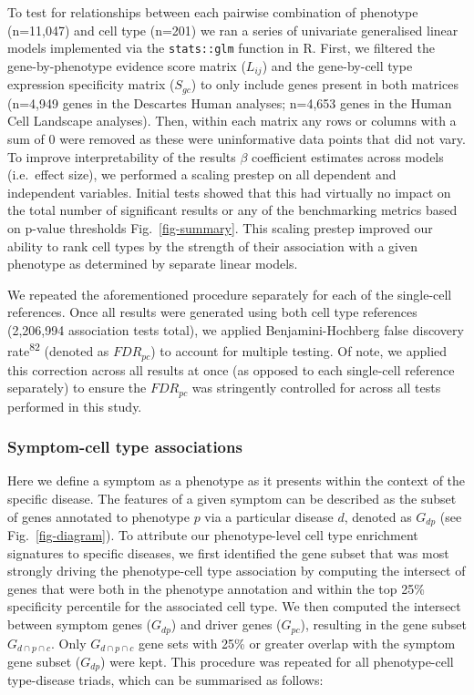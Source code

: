 \documentclass[
]{agujournal2019}
\begin{document}
To test for relationships between each pairwise combination of phenotype
(n=11,047) and cell type (n=201) we ran a series of univariate
generalised linear models implemented via the \texttt{stats::glm}
function in R. First, we filtered the gene-by-phenotype evidence score
matrix (\(L_{ij}\)) and the gene-by-cell type expression specificity
matrix (\(S_{gc}\)) to only include genes present in both matrices
(n=4,949 genes in the Descartes Human analyses; n=4,653 genes in the
Human Cell Landscape analyses). Then, within each matrix any rows or
columns with a sum of 0 were removed as these were uninformative data
points that did not vary. To improve interpretability of the results
\(\beta\) coefficient estimates across models (i.e.~effect size), we
performed a scaling prestep on all dependent and independent variables.
Initial tests showed that this had virtually no impact on the total
number of significant results or any of the benchmarking metrics based
on p-value thresholds Fig.~\ref{fig-summary}. This scaling prestep
improved our ability to rank cell types by the strength of their
association with a given phenotype as determined by separate linear
models.

We repeated the aforementioned procedure separately for each of the
single-cell references. Once all results were generated using both cell
type references (2,206,994 association tests total), we applied
Benjamini-Hochberg false discovery rate\textsuperscript{82} (denoted as
\(FDR_{pc}\)) to account for multiple testing. Of note, we applied this
correction across all results at once (as opposed to each single-cell
reference separately) to ensure the \(FDR_{pc}\) was stringently
controlled for across all tests performed in this study.

\subsubsection{Symptom-cell type
associations}\label{symptom-cell-type-associations}

Here we define a symptom as a phenotype as it presents within the
context of the specific disease. The features of a given symptom can be
described as the subset of genes annotated to phenotype \(p\) via a
particular disease \(d\), denoted as \(G_{dp}\) (see
Fig.~\ref{fig-diagram}). To attribute our phenotype-level cell type
enrichment signatures to specific diseases, we first identified the gene
subset that was most strongly driving the phenotype-cell type
association by computing the intersect of genes that were both in the
phenotype annotation and within the top 25\% specificity percentile for
the associated cell type. We then computed the intersect between symptom
genes (\(G_{dp}\)) and driver genes (\(G_{pc}\)), resulting in the gene
subset \(G_{d \cap p \cap c}\). Only \(G_{d \cap p \cap c}\) gene sets
with 25\% or greater overlap with the symptom gene subset (\(G_{dp}\))
were kept. This procedure was repeated for all phenotype-cell
type-disease triads, which can be summarised as follows:
\end{document}
